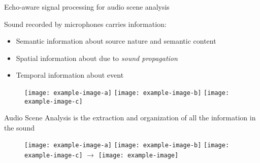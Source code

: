\begin{frame}{Echo-aware signal processing for \alert{audio scene analysis}}

    \begin{block}{Sound recorded by microphones carries information:}
        \vspace{-0.5em}
        \begin{itemize}
            \item \alert{Semantic} information about source nature and semantic content
            \item \alert{Spatial} information about due to \textit{sound propagation}
            \item \alert{Temporal} information about event
        \end{itemize}
    \end{block}

    \begin{figure}
        \centering
        \texttt{[image: example-image-a]}
        \hfill
        \texttt{[image: example-image-b]}
        \hfill
        \texttt{[image: example-image-c]}
    \end{figure}


    \begin{mydefblock}{Audio Scene Analysis}
        \vspace{0.3em}
        is the extraction and organization of all the information in the sound
    \end{mydefblock}

    \begin{figure}
        \centering
        \texttt{[image: example-image-a]}
        \hfill
        \texttt{[image: example-image-b]}
        \hfill
        \texttt{[image: example-image-c]}
        \hfill
        $\rightarrow$
        \hfill
        \texttt{[image: example-image]}
    \end{figure}

\end{frame}

